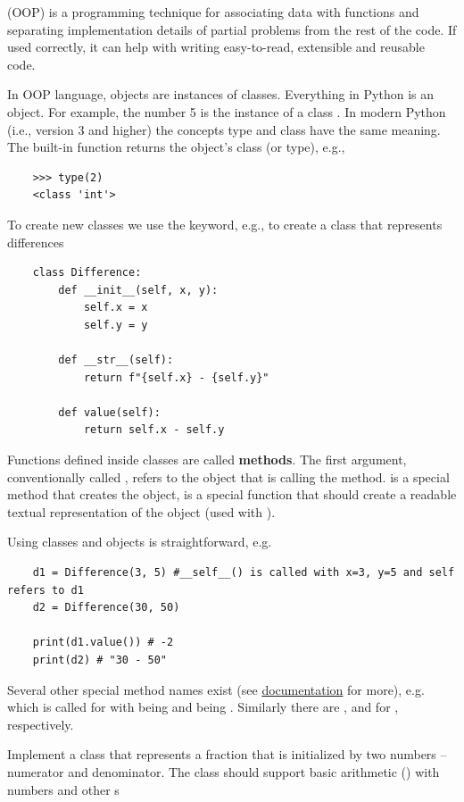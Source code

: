 \begin{syntax}
    (OOP) is a programming technique for associating data with functions and separating implementation details of partial problems from the rest of the code. If used correctly, it can help with writing easy-to-read, extensible and reusable code.

    In OOP language, objects are instances of classes. Everything in Python is an object. For example, the number 5 is the instance of a class . In modern Python (i.e., version 3 and higher) the concepts type and class have the same meaning. The built-in function  returns the object's class (or type), e.g.,
\begin{lstlisting}
    >>> type(2)
    <class 'int'>
\end{lstlisting}

    To create new classes we use the  keyword, e.g., to create a class that represents differences
\begin{lstlisting}
    class Difference:
        def __init__(self, x, y):
            self.x = x
            self.y = y
            
        def __str__(self):
            return f"{self.x} - {self.y}"
        
        def value(self):
            return self.x - self.y
\end{lstlisting}
    Functions defined inside classes are called \textbf{methods}. The first argument, conventionally called , refers to the object that is calling the method.  is a special method that creates the object,  is a special function that should create a readable textual representation of the object (used with ).

    Using classes and objects is straightforward, e.g.
\begin{lstlisting}
    d1 = Difference(3, 5) #__self__() is called with x=3, y=5 and self refers to d1
    d2 = Difference(30, 50) 

    print(d1.value()) # -2
    print(d2) # "30 - 50"
\end{lstlisting}

    Several other special method names exist (see \href{https://docs.python.org/3/reference/datamodel.html#emulating-numeric-types}{documentation} for more), e.g.  which is called for  with  being  and  being . Similarly there are ,  and  for \ls{-, *, /}, respectively.

\begin{exercise}
    Implement a  class that represents a fraction that is initialized by two numbers -- numerator and denominator. The class should support basic arithmetic (\ls{+,-,*,/}) with numbers and other s
\end{exercise}

\end{syntax}